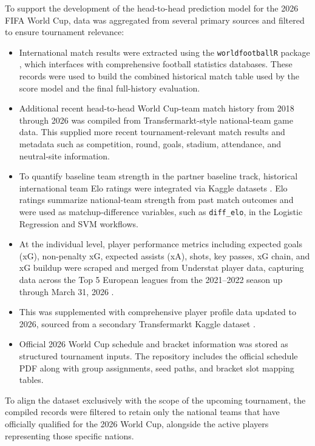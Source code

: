 \documentclass[11pt]{article}
\begin{document}
To support the development of the head-to-head prediction model for the 2026 FIFA World Cup, data was aggregated from several primary sources and filtered to ensure tournament relevance:
\begin{itemize}

\item International match results were extracted using the \texttt{worldfootballR} package \cite{zivkovic_worldfootballR}, which interfaces with comprehensive football statistics databases. These records were used to build the combined historical match table used by the score model and the final full-history evaluation.

\item Additional recent head-to-head World Cup-team match history from 2018 through 2026 was compiled from Transfermarkt-style national-team game data. This supplied more recent tournament-relevant match results and metadata such as competition, round, goals, stadium, attendance, and neutral-site information.

\item To quantify baseline team strength in the partner baseline track, historical international team Elo ratings were integrated via Kaggle datasets \cite{alnimri_elo_ratings}. Elo ratings summarize national-team strength from past match outcomes and were used as matchup-difference variables, such as \texttt{diff\_elo}, in the Logistic Regression and SVM workflows.

\item At the individual level, player performance metrics including expected goals (xG), non-penalty xG, expected assists (xA), shots, key passes, xG chain, and xG buildup were scraped and merged from Understat player data, capturing data across the Top 5 European leagues from the 2021--2022 season up through March 31, 2026 \cite{fbref_top5_data}. 

\item This was supplemented with comprehensive player profile data updated to 2026, sourced from a secondary Transfermarkt Kaggle dataset \cite{cariboo_transfermarkt}. 

\item Official 2026 World Cup schedule and bracket information was stored as structured tournament inputs. The repository includes the official schedule PDF along with group assignments, seed paths, and bracket slot mapping tables.

\end{itemize}
To align the dataset exclusively with the scope of the upcoming tournament, the compiled records were filtered to retain only the national teams that have officially qualified for the 2026 World Cup, alongside the active players representing those specific nations.
\end{document}
